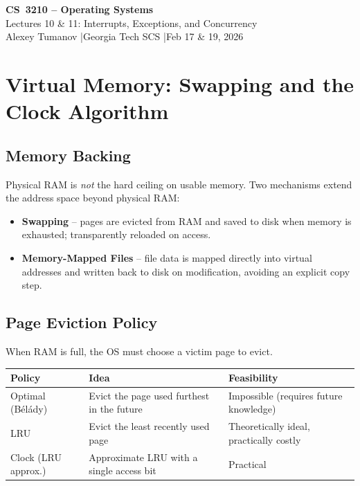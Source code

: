 \documentclass[11pt,a4paper]{article}
\newcommand{\term}[1]{\textbf{#1}}
\begin{document}
\begin{center}
  {\LARGE\bfseries CS~3210 -- Operating Systems}\\[4pt]
  {\large Lectures 10 \& 11: Interrupts, Exceptions, and Concurrency}\\[4pt]
  {\normalsize Alexey Tumanov \quad|\quad Georgia Tech SCS
    \quad|\quad Feb 17 \& 19, 2026}
\end{center}

\tableofcontents
\newpage

\section{Virtual Memory: Swapping and the Clock Algorithm}

\subsection{Memory Backing}

Physical RAM is \emph{not} the hard ceiling on usable memory.  Two mechanisms
extend the address space beyond physical RAM:

\begin{itemize}
  \item \term{Swapping} -- pages are evicted from RAM and saved to disk when
    memory is exhausted; transparently reloaded on access.
  \item \term{Memory-Mapped Files} -- file data is mapped directly into virtual
    addresses and written back to disk on modification, avoiding an explicit
    copy step.
\end{itemize}

\subsection{Page Eviction Policy}

When RAM is full, the OS must choose a victim page to evict.

\begin{center}
\begin{tabular}{lll}
  \toprule
  \textbf{Policy} & \textbf{Idea} & \textbf{Feasibility} \\
  \midrule
  Optimal (Bélády) & Evict the page used furthest in the future & Impossible (requires future knowledge) \\
  LRU              & Evict the least recently used page          & Theoretically ideal, practically costly \\
  Clock (LRU approx.) & Approximate LRU with a single access bit & Practical \\
  \bottomrule
\end{tabular}
\end{center}
\end{document}
